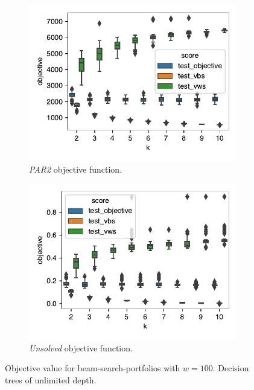 \documentclass[conference]{IEEEtran}
\begin{document}
\begin{figure}[htb]
	\centering
	\begin{subfigure}{0.98\columnwidth}
		\centering
		\includegraphics[width=\columnwidth]{plots/objective-prediction-PAR2.pdf}
		\caption{\emph{PAR2} objective function.}
		\label{fig:objective-prediction-PAR2}
	\end{subfigure}
	\hfill
	\begin{subfigure}{0.98\columnwidth}
		\centering
		\includegraphics[width=\columnwidth]{plots/objective-prediction-solved.pdf}
		\caption{\emph{Unsolved} objective function.}
		\label{fig:objective-prediction-unsolved}
	\end{subfigure}
	\caption{Objective value for beam-search-portfolios with $w=100$. Decision trees of unlimited depth.}
	\label{fig:objective-prediction}
\end{figure}
\end{document}

